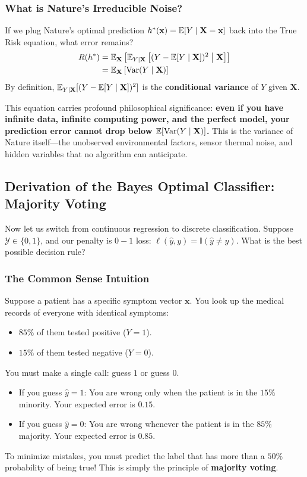 \subsubsection{What is Nature's Irreducible Noise?}
If we plug Nature's optimal prediction $h^*(\mathbf{x}) = \operatorname{\mathbb{E}}[Y \mid \mathbf{X} = \mathbf{x}]$ back into the True Risk equation, what error remains?
\begin{align}
R(h^*) &= \operatorname{\mathbb{E}}_{\mathbf{X}} \left[ \operatorname{\mathbb{E}}_{Y \mid \mathbf{X}} \left[ (Y - \operatorname{\mathbb{E}}[Y \mid \mathbf{X}])^2 \;\middle|\; \mathbf{X} \right] \right] \nonumber \\
&= \operatorname{\mathbb{E}}_{\mathbf{X}} \left[ \operatorname{Var}(Y \mid \mathbf{X}) \right]
\label{eq:irreducible_variance_ped}
\end{align}
By definition, $\operatorname{\mathbb{E}}_{Y \mid \mathbf{X}} [ (Y - \operatorname{\mathbb{E}}[Y \mid \mathbf{X}])^2 ]$ is the \textbf{conditional variance} of $Y$ given $\mathbf{X}$. 

This equation carries profound philosophical significance: \textbf{even if you have infinite data, infinite computing power, and the perfect model, your prediction error cannot drop below $\operatorname{\mathbb{E}}[\operatorname{Var}(Y \mid \mathbf{X})]$.} This is the variance of Nature itself—the unobserved environmental factors, sensor thermal noise, and hidden variables that no algorithm can anticipate.

\subsection{Derivation of the Bayes Optimal Classifier: Majority Voting}
Now let us switch from continuous regression to discrete classification. Suppose $\mathcal{Y} \in \{0, 1\}$, and our penalty is $0-1$ loss: $\ell(\hat{y}, y) = \mathbb{I}(\hat{y} \ne y)$. What is the best possible decision rule?

\subsubsection{The Common Sense Intuition}
Suppose a patient has a specific symptom vector $\mathbf{x}$. You look up the medical records of everyone with identical symptoms:
\begin{itemize}
    \item $85\%$ of them tested positive ($Y = 1$).
    \item $15\%$ of them tested negative ($Y = 0$).
\end{itemize}
You must make a single call: guess $1$ or guess $0$.
\begin{itemize}
    \item If you guess $\hat{y} = 1$: You are wrong only when the patient is in the $15\%$ minority. Your expected error is \textbf{$0.15$}.
    \item If you guess $\hat{y} = 0$: You are wrong whenever the patient is in the $85\%$ majority. Your expected error is \textbf{$0.85$}.
\end{itemize}
To minimize mistakes, you must predict the label that has more than a $50\%$ probability of being true! This is simply the principle of \textbf{majority voting}.

